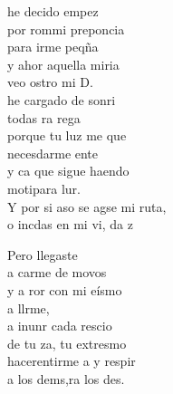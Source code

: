 \begin{cancion}
	he decido empez\\
	por rommi preponcia \\
	para irme peqña\\
	y ahor aquella miria\\
	veo ostro mi D. \\
	\jump
	 he cargado de sonri \\
	todas ra rega\\
	porque tu luz me que \\
	necesdarme ente \\
	y ca que sigue haendo \\
	motipara lur. \\
	\jump
	Y por si aso se agse mi ruta,\\
	o incdas en mi vi, da z\jump\\
	\begin{chorus}%
		Pero llegaste   \\
		a carme de movos\\
		y a ror con mi eísmo\\
		a llrme, \\
		a inunr cada rescio\\
		de tu za, tu extresmo \\
		hacerentirme a y respir \\
		a los dems,ra los des. \jump\\
	\end{chorus}%
	\jump
\end{cancion}%
